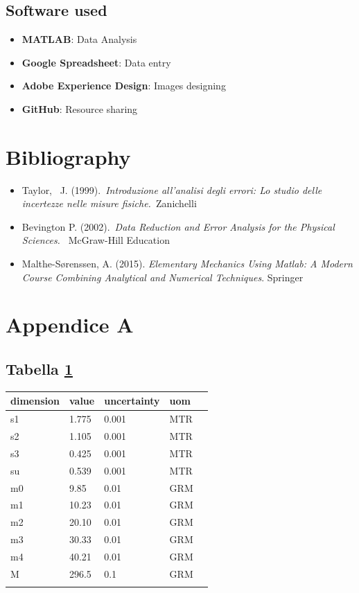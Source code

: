 \documentclass[11pt,a4paper]{article}
\begin{document}
\subsection{Software used}
\begin{itemize}
\item
  \textbf{MATLAB}: Data Analysis
\item
  \textbf{Google Spreadsheet}: Data entry
\item
  \textbf{Adobe Experience Design}: Images designing
\item
  \textbf{GitHub}: Resource sharing
\end{itemize}

\section{Bibliography}
\begin{itemize}
\item
  Taylor,~ J. (1999).~\emph{Introduzione all'analisi degli errori: Lo
  studio delle incertezze nelle misure fisiche.~}Zanichelli
\item
  Bevington P. (2002).~\emph{Data Reduction and Error Analysis for the
  Physical Sciences.~} McGraw-Hill Education ~
\item Malthe-Sørenssen, A. (2015). \emph{Elementary Mechanics Using Matlab: A Modern Course Combining Analytical and Numerical Techniques}. Springer
\end{itemize}

\section{Appendice A}
\subsection{Tabella \ref{expdata1}}

\begin{longtable}[]{@{}lllll@{}}
\toprule
dimension & value & uncertainty & uom \tabularnewline
\midrule
\endhead
s1 & 1.775 & 0.001 & MTR \tabularnewline
s2 & 1.105 & 0.001 & MTR \tabularnewline
s3 & 0.425 & 0.001 & MTR \tabularnewline
su & 0.539 & 0.001 & MTR \tabularnewline
m0 & 9.85 & 0.01 & GRM \tabularnewline
m1 & 10.23 & 0.01 & GRM \tabularnewline
m2 & 20.10 & 0.01 & GRM \tabularnewline
m3 & 30.33 & 0.01 & GRM \tabularnewline
m4 & 40.21 & 0.01 & GRM \tabularnewline
M & 296.5 & 0.1 & GRM \tabularnewline
\bottomrule
\label{expdata1}
\end{longtable}
\end{document}
